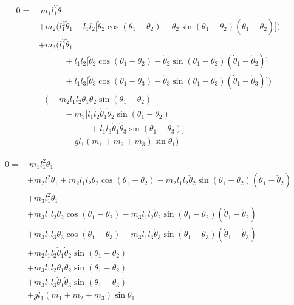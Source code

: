 \documentclass[11pt,a4paper]{article}
\begin{document}
\begin{align*}
  0 =& \ m_1 l_1^2 \ddot{\theta}_1 \\
     &+ m_2 \Big( l_1^2 \ddot{\theta}_1 + l_1 l_2 \big[ \ddot{\theta}_2 \cos(\theta_1 - \theta_2) - \dot{\theta}_2 \sin(\theta_1 - \theta_2)(\dot\theta_1 - \dot\theta_2) \big] \Big) \\
     &+ m_3 \Big( l_1^2 \ddot{\theta}_1 \\
     &\qquad\quad + l_1 l_2 \big[ \ddot{\theta}_2 \cos(\theta_1 - \theta_2) - \dot{\theta}_2 \sin(\theta_1 - \theta_2)(\dot\theta_1 - \dot\theta_2) \big] \\
     &\qquad\quad + l_1 l_3 \big[ \ddot{\theta}_3 \cos(\theta_1 - \theta_3) - \dot{\theta}_3 \sin(\theta_1 - \theta_3)(\dot\theta_1 - \dot\theta_3) \big] \Big) \\
     &- \Bigg( - m_2 l_1 l_2 \dot{\theta}_1 \dot{\theta}_2 \sin(\theta_1 - \theta_2) \\
     &\qquad\quad - m_3 \Big[ l_1 l_2 \dot{\theta}_1 \dot{\theta}_2 \sin(\theta_1 - \theta_2) \\
     &\qquad\qquad\qquad + l_1 l_3 \dot{\theta}_1 \dot{\theta}_3 \sin(\theta_1 - \theta_3) \Big] \\
     &\qquad\quad - g l_1 (m_1 + m_2 + m_3) \sin\theta_1 \Bigg)
\end{align*}

\begin{align*}
  0 =& \ m_1 l_1^2 \ddot{\theta}_1 \\
     &+ m_2 l_1^2 \ddot{\theta}_1 + m_2 l_1 l_2 \ddot{\theta}_2 \cos(\theta_1 - \theta_2) - m_2 l_1 l_2 \dot{\theta}_2 \sin(\theta_1 - \theta_2)(\dot\theta_1 - \dot\theta_2) \\
     &+ m_3 l_1^2 \ddot{\theta}_1 \\
     &+ m_3 l_1 l_2 \ddot{\theta}_2 \cos(\theta_1 - \theta_2) - m_3 l_1 l_2 \dot{\theta}_2 \sin(\theta_1 - \theta_2)(\dot\theta_1 - \dot\theta_2) \\
     &+ m_3 l_1 l_3 \ddot{\theta}_3 \cos(\theta_1 - \theta_3) - m_3 l_1 l_3 \dot{\theta}_3 \sin(\theta_1 - \theta_3)(\dot\theta_1 - \dot\theta_3) \\
     &+ m_2 l_1 l_2 \dot{\theta}_1 \dot{\theta}_2 \sin(\theta_1 - \theta_2) \\
     &+ m_3 l_1 l_2 \dot{\theta}_1 \dot{\theta}_2 \sin(\theta_1 - \theta_2) \\
     &+ m_3 l_1 l_3 \dot{\theta}_1 \dot{\theta}_3 \sin(\theta_1 - \theta_3) \\
     &+ g l_1 (m_1 + m_2 + m_3) \sin\theta_1
\end{align*}
\end{document}
